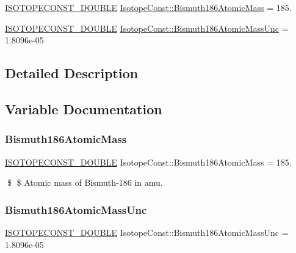 \begin{DoxyCompactItemize}
\item 
\mbox{\hyperlink{group___isotope_const-_macros_ga8f45a7272ce02c0b4c65c44636ed719a}{I\+S\+O\+T\+O\+P\+E\+C\+O\+N\+S\+T\+\_\+\+D\+O\+U\+B\+LE}} \mbox{\hyperlink{group___isotope_const-_bismuth-_bi186_ga78a75f9f3be7e0fc4d3c41e66743db4c}{Isotope\+Const\+::\+Bismuth186\+Atomic\+Mass}} = 185.
\item 
\mbox{\hyperlink{group___isotope_const-_macros_ga8f45a7272ce02c0b4c65c44636ed719a}{I\+S\+O\+T\+O\+P\+E\+C\+O\+N\+S\+T\+\_\+\+D\+O\+U\+B\+LE}} \mbox{\hyperlink{group___isotope_const-_bismuth-_bi186_ga76e1258e154a2de2a60bbcbb8b02ff85}{Isotope\+Const\+::\+Bismuth186\+Atomic\+Mass\+Unc}} = 1.\+8096e-\/05
\end{DoxyCompactItemize}


\subsection{Detailed Description}


\subsection{Variable Documentation}
\mbox{\label{group___isotope_const-_bismuth-_bi186_ga78a75f9f3be7e0fc4d3c41e66743db4c}} 
\subsubsection{\texorpdfstring{Bismuth186\+Atomic\+Mass}{Bismuth186AtomicMass}}
{\footnotesize\ttfamily \mbox{\hyperlink{group___isotope_const-_macros_ga8f45a7272ce02c0b4c65c44636ed719a}{I\+S\+O\+T\+O\+P\+E\+C\+O\+N\+S\+T\+\_\+\+D\+O\+U\+B\+LE}} Isotope\+Const\+::\+Bismuth186\+Atomic\+Mass = 185.}

\$ \$ Atomic mass of Bismuth-\/186 in amu. \mbox{\label{group___isotope_const-_bismuth-_bi186_ga76e1258e154a2de2a60bbcbb8b02ff85}} 
\subsubsection{\texorpdfstring{Bismuth186\+Atomic\+Mass\+Unc}{Bismuth186AtomicMassUnc}}
{\footnotesize\ttfamily \mbox{\hyperlink{group___isotope_const-_macros_ga8f45a7272ce02c0b4c65c44636ed719a}{I\+S\+O\+T\+O\+P\+E\+C\+O\+N\+S\+T\+\_\+\+D\+O\+U\+B\+LE}} Isotope\+Const\+::\+Bismuth186\+Atomic\+Mass\+Unc = 1.\+8096e-\/05}

